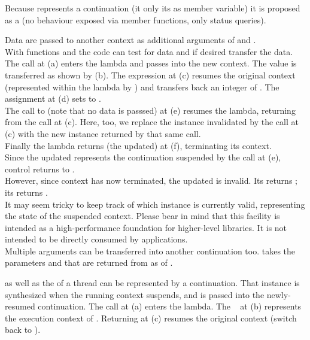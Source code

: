 \label{design}

Because \cont represents a continuation (it  only its
 as member variable) it is proposed as a
 (no behaviour exposed via member functions,
only status queries).


\label{subsec:data}

Data are passed to another context as additional arguments of \call and
\resume.\\
With functions \davail and \dget the code can test for data and if desired
transfer the data.
The  call at (a) enters the lambda and passes  into the
new context. The value is transferred as shown by (b). The expression
 at (c) resumes the original context (represented
within the lambda by ) and transfers back an integer of .
The assignment at (d) sets  to .\\
The call to  (note that no data is passsed) at (e) resumes the
 lambda, returning from the  call at (c). Here, too,
we replace the \cont instance  invalidated by the \resume call at (c)
with the new instance returned by that same \resume call.\\
Finally the lambda returns (the updated)  at (f), terminating its
context.\\
Since the updated  represents the continuation suspended by the call at
(e), control returns to \main.\\
However, since context  has now terminated, the updated  is
invalid. Its \opbool returns ; its  returns
.\\
It may seem tricky to keep track of which \cont instance is currently valid,
representing the state of the suspended context. Please bear in mind that this
facility is intended as a high-performance foundation for higher-level
libraries. It is not intended to be directly consumed by applications.\\
Multiple arguments can be transferred into another continuation too.
\call takes the parameters  and  that are returned from \dget
as  of .


\label{subsec:main}

\main as well as the \entryfn of a thread can be represented by a continuation.
That \cont instance is synthesized when the running context suspends, and is
passed into the newly-resumed continuation.
The  call at (a) enters the lambda. The \cont\  at (b)
represents the execution context of \main. Returning  at (c) resumes the
original context (switch back to \main).


